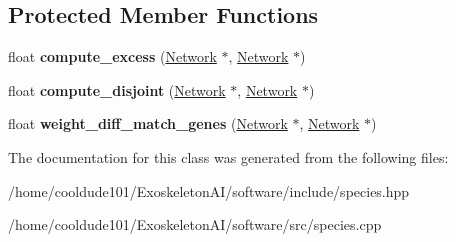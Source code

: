 \subsection*{Protected Member Functions}
\begin{DoxyCompactItemize}
\item 
float {\bfseries compute\+\_\+excess} (\hyperlink{classNetwork}{Network} $\ast$, \hyperlink{classNetwork}{Network} $\ast$)\hypertarget{classSpecies_a2e078a85f8a79ad28bca731bb9d14c23}{}\label{classSpecies_a2e078a85f8a79ad28bca731bb9d14c23}

\item 
float {\bfseries compute\+\_\+disjoint} (\hyperlink{classNetwork}{Network} $\ast$, \hyperlink{classNetwork}{Network} $\ast$)\hypertarget{classSpecies_ade428d94ad7729e79422c5473b1f6cf6}{}\label{classSpecies_ade428d94ad7729e79422c5473b1f6cf6}

\item 
float {\bfseries weight\+\_\+diff\+\_\+match\+\_\+genes} (\hyperlink{classNetwork}{Network} $\ast$, \hyperlink{classNetwork}{Network} $\ast$)\hypertarget{classSpecies_a732289d5916f65785694da76a26ff957}{}\label{classSpecies_a732289d5916f65785694da76a26ff957}

\end{DoxyCompactItemize}


The documentation for this class was generated from the following files\+:\begin{DoxyCompactItemize}
\item 
/home/cooldude101/\+Exoskeleton\+A\+I/software/include/species.\+hpp\item 
/home/cooldude101/\+Exoskeleton\+A\+I/software/src/species.\+cpp\end{DoxyCompactItemize}
